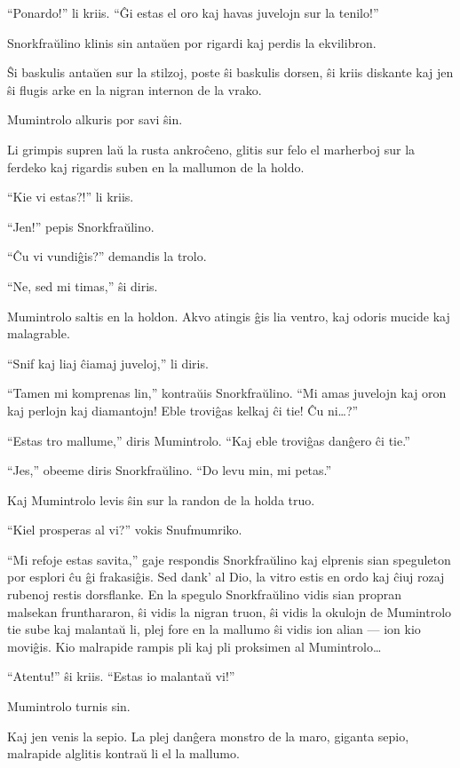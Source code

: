 ``Ponardo!'' li kriis. ``Ĝi estas el oro kaj havas juvelojn sur la tenilo!''

Snorkfraŭlino klinis sin antaŭen por rigardi kaj perdis la ekvilibron.

Ŝi baskulis antaŭen sur la stilzoj, poste ŝi baskulis dorsen, ŝi kriis diskante kaj jen ŝi flugis arke en la nigran internon de la vrako.

Mumintrolo alkuris por savi ŝin.

Li grimpis supren laŭ la rusta ankroĉeno, glitis sur felo el marherboj sur la ferdeko kaj rigardis suben en la mallumon de la holdo.

``Kie vi estas?!'' li kriis.

``Jen!'' pepis Snorkfraŭlino.

``Ĉu vi vundiĝis?'' demandis la trolo.

``Ne, sed mi timas,'' ŝi diris.

Mumintrolo saltis en la holdon. Akvo atingis ĝis lia ventro, kaj odoris mucide kaj malagrable.

``Snif kaj liaj ĉiamaj juveloj,'' li diris.

``Tamen mi komprenas lin,'' kontraŭis Snorkfraŭlino. ``Mi amas juvelojn kaj oron kaj perlojn kaj diamantojn! Eble troviĝas kelkaj ĉi tie! Ĉu ni{\ldots}?''

``Estas tro mallume,'' diris Mumintrolo. ``Kaj eble troviĝas danĝero ĉi tie.''

``Jes,'' obeeme diris Snorkfraŭlino. ``Do levu min, mi petas.''

Kaj Mumintrolo levis ŝin sur la randon de la holda truo.

``Kiel prosperas al vi?'' vokis Snufmumriko.

``Mi refoje estas savita,'' gaje respondis Snorkfraŭlino kaj elprenis sian speguleton por esplori ĉu ĝi frakasiĝis. Sed dank' al Dio, la vitro estis en ordo kaj ĉiuj rozaj rubenoj restis dorsflanke. En la spegulo Snorkfraŭlino vidis sian propran malsekan frunthararon, ŝi vidis la nigran truon, ŝi vidis la okulojn de Mumintrolo tie sube kaj malantaŭ li, plej fore en la mallumo ŝi vidis ion alian --- ion kio moviĝis. Kio malrapide rampis pli kaj pli proksimen al Mumintrolo{\ldots}

``Atentu!'' ŝi kriis. ``Estas io malantaŭ vi!''

Mumintrolo turnis sin.

Kaj jen venis la sepio. La plej danĝera monstro de la maro, giganta sepio, malrapide alglitis kontraŭ li el la mallumo.

